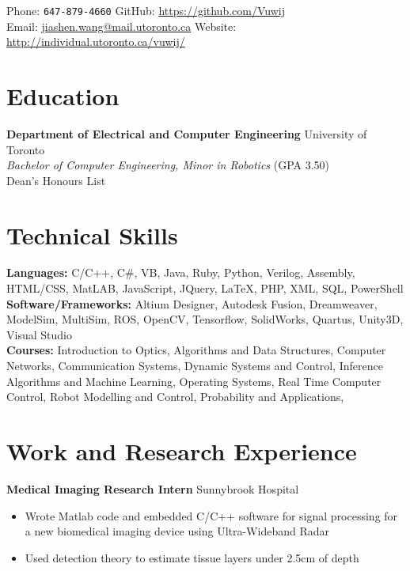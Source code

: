 \documentclass[10pt, a4paper]{cv}
\begin{document}

Phone: \texttt{647-879-4660} \hfill
GitHub: \href{https://github.com/Vuwij}{https://github.com/Vuwij}\\
Email: \href{mailto:jiashen.wang@mail.utoronto.ca}{jiashen.wang@mail.utoronto.ca}\hfill
Website: \href{http://individual.utoronto.ca/vuwij/}{http://individual.utoronto.ca/vuwij/}

\section*{Education}
\textbf{Department of Electrical and Computer Engineering} \hfill University of Toronto\\
\emph{Bachelor of Computer Engineering, Minor in Robotics} \small{\textsc{(GPA 3.50)}}\\[0.1mm]
\small Dean's Honours List

\section*{Technical Skills}
\textbf{Languages:} C/C++, C\#, VB, Java, Ruby, Python, Verilog, Assembly, HTML/CSS, MatLAB, JavaScript, JQuery, LaTeX, PHP, XML, SQL, PowerShell\\[0.2em]
\textbf{Software/Frameworks:} Altium Designer, Autodesk Fusion, Dreamweaver, ModelSim, MultiSim, ROS, OpenCV, Tensorflow, SolidWorks, Quartus, Unity3D, Visual Studio\\[0.2em]
\textbf{Courses:} Introduction to Optics, Algorithms and Data Structures, Computer Networks, Communication Systems, Dynamic Systems and Control, Inference Algorithms and Machine Learning, Operating Systems, Real Time Computer Control, Robot Modelling and Control, Probability and Applications, 

\section*{Work and Research Experience}\noindent

	\textbf{Medical Imaging Research Intern} \hfill Sunnybrook Hospital
	\begin{itemize}
		\item Wrote Matlab code and embedded C/C++ software for signal processing for a new biomedical imaging device using Ultra-Wideband Radar
		\item Used detection theory to estimate tissue layers under 2.5cm of depth
	\end{itemize}
	
\end{document}
